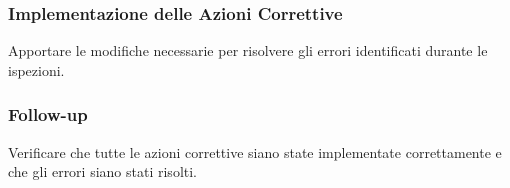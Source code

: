 \subsubsection{Implementazione delle Azioni Correttive} 
Apportare le
	  modifiche necessarie per risolvere gli errori identificati durante le
	  ispezioni.

\subsubsection{Follow-up} 
Verificare che tutte le azioni
	  correttive siano state implementate correttamente e che gli errori
	  siano stati risolti.


